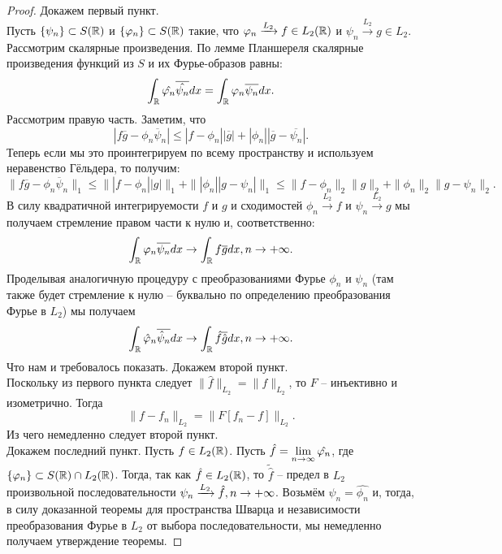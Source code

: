 \begin{proof}
    Докажем первый пункт. \\
    Пусть $\{\psi_n\} \subset S(\mathbb{R})$ и $\{\varphi_n\} \subset S(\mathbb{R})$ такие, что $\varphi_n \xrightarrow{L_2} f \in L_2(\mathbb{R})$ и $\psi_n \xrightarrow{L_2} g \in L_2$.
    Рассмотрим скалярные произведения. По лемме Планшереля скалярные произведения функций из $S$ и их Фурье-образов равны:
    \[
        \int_{\mathbb{R}} \hat{\varphi_n} \overline{\hat{\psi_n}}dx = \int_{\mathbb{R}} \varphi_n \overline{\psi_n} dx.
    \]
    Рассмотрим правую часть. 
    Заметим, что
    \[
        |f\overline{g} - \phi_n \overline{\psi}_n| \leq |f - \phi_n||\overline{g}| + |\phi_n||\overline{g} - \overline{\psi_n}|.
    \]
    Теперь если мы это проинтегрируем по всему пространству и используем неравенство Гёльдера, то получим:
    \[
        \|f\overline{g} - \phi_n \overline{\psi}_n\|_1 \leq \||f - \phi_n||g|\|_1 + \||\phi_n||g - \psi_n|\|_1 \leq \|f - \phi_n\|_2\|g\|_2 + \|\phi_n\|_2 \|g - \psi_n\|_2.
    \]
    В силу квадратичной интегрируемости $f$ и $g$ и сходимостей $\phi_n \xrightarrow{L_2} f$ и $\psi_n \xrightarrow{L_2} g$ мы получаем стремление правом части к нулю и, соответственно:
    \[
        \int_{\mathbb{R}} \varphi_n \overline{\psi_n}dx \rightarrow \int_{\mathbb{R}}f \overline{g}dx, n \rightarrow +\infty.
    \]
    Проделывая аналогичную процедуру с преобразованиями Фурье $\phi_n$ и $\psi_n$ (там также будет стремление к нулю -- буквально по определению преобразования Фурье в $L_2$) мы получаем
    \[
        \int_{\mathbb{R}} \hat{\varphi}_n\overline{\hat{\psi}_n}dx \rightarrow \int_{\mathbb{R}} \hat{f} \overline{\hat{g}}dx, n \rightarrow +\infty.
    \]
    Что нам и требовалось показать.
    Докажем второй пункт. \\
    Поскольку из первого пункта следует $\|\hat{f}\|_{L_2} = \|f\|_{L_2}$, то $F$ -- инъективно и изометрично.
    Тогда
    \[
        \|f - f_n\|_{L_2} = \|F[f_n - f]\|_{L_2}.
    \]
    Из чего немедленно следует второй пункт. \\
    Докажем последний пункт.
    Пусть $f \in L_2(\mathbb{R})$.
    Пусть $\hat{f} = \lim\limits_{n \rightarrow \infty} \hat{\varphi_n}$, где $\{\varphi_n\} \subset S(\mathbb{R}) \cap L_2(\mathbb{R})$.
    Тогда, так как $\hat{f} \in L_2(\mathbb{R})$, то $\tilde{\hat{f}}$ -- предел в $L_2$ произвольной последовательности $\psi_n \xrightarrow{L_2} \hat{f}, n \rightarrow +\infty$.
    Возьмём $\psi_n = \hat{\phi_n}$ и, тогда, в силу доказанной теоремы для пространства Шварца и независимости преобразования Фурье в $L_2$ от выбора последовательности, мы немедленно получаем утверждение теоремы.
\end{proof}
